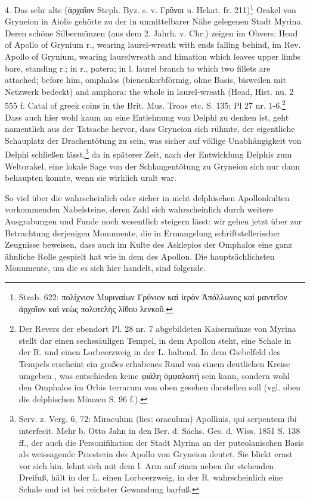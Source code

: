 \documentclass[a4paper, 11pt, oneside]{article}
\newcommand*\svgABL{}
\newcommand*\svgABM{}
\begin{document}
4. Das sehr alte (ἀρχαῖον Steph. Byz. s. v. Γρῦνοι u. Hekat. fr. 211)\footnote{Strab. 622: πολίχνιον Μυριναίων Γρύνιον καὶ ἱερὸν Ἀπόλλωνος καὶ μαντεῖον ἀρχαῖον καὶ νεὼς πολυτελὴς λίθου λενκοῦ.} Orakel von Gryneion in Aiolis gehörte zu der in unmittelbarer Nähe gelegenen Stadt Myrina. Deren schöne Silbermünzen (aus dem 2. Jahrh. v. Chr.) zeigen im Obvers: Head of Apollo of Grynium r., wearing laurel-wreath with ends falling behind, im Rev. $\svgABL$ Apollo of Grynium, wearing laurelwreath and himation which leaves upper limbs bare, standing r.; in r., patera; in l. laurel branch to which two fillets are attached; before him, omphalos (bienenkorbförmig, ohne Basis, bisweilen mit Netzwerk bedeckt) and amphora: the whole in laurel-wreath (Head, Hist. nu. 2 555 f. Catal of greek coins in the Brit. Mus. Troas etc. S. 135; Pl 27 nr. 1-6.\footnote{Der Revers der ebendort Pl. 28 nr. 7 abgebildeten Kaisermünze von Myrina stellt dar einen sechssäuligen Tempel, in dem Apollon steht, eine Schale in der R. und einen Lorbeerzweig in der L. haltend. In dem Giebelfeld des Tempels erscheint ein großes erhabenes Rund von einem deutlichen Kreise umgeben $\svgABM$, was entschieden keine φιάλη ὀμφαλωτή sein kann, sondern wohl den Omphalos im Orbis terrarum von oben gesehen darstellen soll (vgl. oben die delphischen Münzen S. 96 f.).} Dass auch hier wohl kaum an eine Entlehnung von Delphi zu denken ist, geht namentlich aus der Tatsache hervor, dass Gryneion sich rühmte, der eigentliche Schauplatz der Drachentötung zu sein, was sicher auf völlige Unabhängigkeit von Delphi schließen lässt,\footnote{Serv. z. Verg. 6, 72: Miraculum (lies: oraculum) Apollinis, qui serpentem ibi interfecit. Mehr b. Otto Jahn in den Ber. d. Sächs. Ges. d. Wiss. 1851 S. 138 ff., der auch die Personifikation der Stadt Myrina an der puteolanischen Basis als weissagende Priesterin des Apollo von Gryneion deutet. Sie blickt ernst vor sich hin, lehnt sich mit dem l. Arm auf einen neben ihr stehenden Dreifuß, hält in der L. einen Lorbeerzweig, in der R. wahrscheinlich eine Schale und ist bei reichster Gewandung barfuß.} da in späterer Zeit, nach der Entwicklung Delphis zum Weltorakel, eine lokale Sage von der Schlangentötung zu Gryneion sich nur dann behaupten konnte, wenn sie wirklich uralt war.

So viel über die wahrscheinlich oder sicher in nicht delphischen Apollonkulten vorkommenden Nabelsteine, deren Zahl sich wahrscheinlich durch weitere Ausgrabungen und Funde noch wesentlich steigern lässt: wir gehen jetzt über zur Betrachtung derjenigen Monumente, die in Ermangelung schriftstellerischer Zeugnisse beweisen, dass auch im Kulte des Asklepios der Omphalos eine ganz ähnliche Rolle gespielt hat wie in dem des Apollon. Die hauptsächlichsten Monumente, um die es sich hier handelt, sind folgende.
\end{document}
